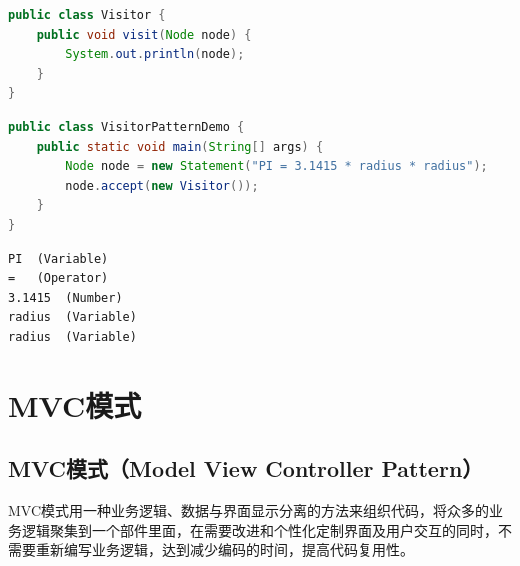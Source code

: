 \begin{lstlisting}[language=Java, title=Visitor.java]
public class Visitor {
    public void visit(Node node) {
        System.out.println(node);
    }
}
\end{lstlisting}

\begin{lstlisting}[language=Java, title=VisitorPatternDemo.java]
public class VisitorPatternDemo {
    public static void main(String[] args) {
        Node node = new Statement("PI = 3.1415 * radius * radius");
        node.accept(new Visitor());
    }
}
\end{lstlisting}

\begin{tcolorbox}
    \begin{verbatim}
PI	(Variable)
=	(Operator)
3.1415	(Number)
radius	(Variable)
radius	(Variable)
\end{verbatim}
\end{tcolorbox}

\newpage

\section{MVC模式}

\subsection{MVC模式（Model View Controller Pattern）}

MVC模式用一种业务逻辑、数据与界面显示分离的方法来组织代码，将众多的业务逻辑聚集到一个部件里面，在需要改进和个性化定制界面及用户交互的同时，不需要重新编写业务逻辑，达到减少编码的时间，提高代码复用性。\\

\\

